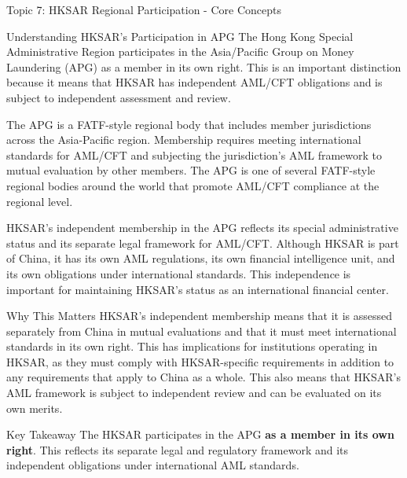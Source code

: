 \documentclass[5pt]{beamer}
\begin{document}
	\begin{frame}{Topic 7: HKSAR Regional Participation - Core Concepts}
		\begin{block}{\tiny Understanding HKSAR's Participation in APG}
			\tiny The Hong Kong Special Administrative Region participates in the Asia/Pacific Group on Money Laundering (APG) as a member in its own right. This is an important distinction because it means that HKSAR has independent AML/CFT obligations and is subject to independent assessment and review.
			
			The APG is a FATF-style regional body that includes member jurisdictions across the Asia-Pacific region. Membership requires meeting international standards for AML/CFT and subjecting the jurisdiction's AML framework to mutual evaluation by other members. The APG is one of several FATF-style regional bodies around the world that promote AML/CFT compliance at the regional level.
			
			HKSAR's independent membership in the APG reflects its special administrative status and its separate legal framework for AML/CFT. Although HKSAR is part of China, it has its own AML regulations, its own financial intelligence unit, and its own obligations under international standards. This independence is important for maintaining HKSAR's status as an international financial center.
		\end{block}
		
		\begin{block}{\tiny Why This Matters}
			\tiny HKSAR's independent membership means that it is assessed separately from China in mutual evaluations and that it must meet international standards in its own right. This has implications for institutions operating in HKSAR, as they must comply with HKSAR-specific requirements in addition to any requirements that apply to China as a whole. This also means that HKSAR's AML framework is subject to independent review and can be evaluated on its own merits.
		\end{block}
		
		\begin{alertblock}{Key Takeaway}
			\tiny The HKSAR participates in the APG \textbf{as a member in its own right}. This reflects its separate legal and regulatory framework and its independent obligations under international AML standards.
		\end{alertblock}
	\end{frame}
	
\end{document}
